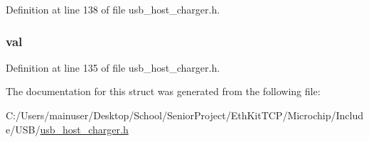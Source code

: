 Definition at line 138 of file usb\+\_\+host\+\_\+charger.\+h.

\hypertarget{struct_u_s_b___c_h_a_r_g_i_n_g___d_e_v_i_c_e_a5986ea8162aa0f6608b36b20964044dd}{}
\subsubsection[{val}]{ val}\label{struct_u_s_b___c_h_a_r_g_i_n_g___d_e_v_i_c_e_a5986ea8162aa0f6608b36b20964044dd}


Definition at line 135 of file usb\+\_\+host\+\_\+charger.\+h.



The documentation for this struct was generated from the following file\+:\begin{DoxyCompactItemize}
\item 
C\+:/\+Users/mainuser/\+Desktop/\+School/\+Senior\+Project/\+Eth\+Kit\+T\+C\+P/\+Microchip/\+Include/\+U\+S\+B/\hyperlink{usb__host__charger_8h}{usb\+\_\+host\+\_\+charger.\+h}\end{DoxyCompactItemize}
